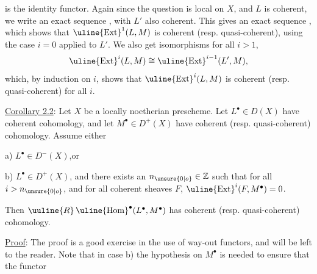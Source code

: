 is the identity functor. Again since the question is local on $X$, and $L$ is coherent, we write an exact sequence
,
with $L'$ also coherent. This gives an exact sequence
,
which shows that $\uline{\operatorname{Ext}}^1(L,M)$ is coherent (resp. quasi-coherent), using the case $i=0$ applied to $L'$. We also get isomorphisms for all $i>1$,
\[
\uline{\operatorname{Ext}}^i(L,M)\cong\uline{\operatorname{Ext}}^{i-1}(L',M),
\]
which, by induction on $i$, shows that $\uline{\operatorname{Ext}}^i(L,M)$ is coherent (resp. quasi-coherent) for all $i$.

\uline{Corollary 2.2}: Let $X$ be a locally noetherian prescheme. Let $L^\bullet\in D(X)$ have coherent cohomology, and let $M^\bullet\in D^+(X)$ have coherent (resp. quasi-coherent) cohomology. Assume either

a) $L^\bullet\in D^-(X)$,\qquad or

b) $L^\bullet\in D^+(X)$, and there exists an $n_{\unsure{0|o}}\in\mathbb Z$ such that for all $i>n_{\unsure{0|o}}$, and for all coherent sheaves $F$, $\uline{\operatorname{Ext}}^i(F,M^\bullet)=0$.

Then $\uuline{R}\,\uline{\operatorname{Hom}}^\bullet(L^\bullet,M^\bullet)$ has coherent (resp. quasi-coherent) cohomology.

\uline{Proof}: The proof is a good exercise in the use of way-out functors, and will be left to the reader. Note that in case b) the hypothesis on $M^\bullet$ is needed to ensure that the functor

